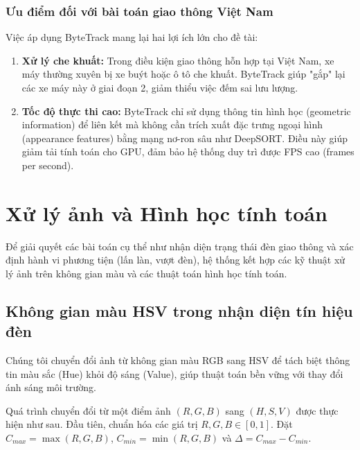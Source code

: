 \subsubsection{Ưu điểm đối với bài toán giao thông Việt Nam}
Việc áp dụng ByteTrack mang lại hai lợi ích lớn cho đề tài:
\begin{enumerate}
    \item \textbf{Xử lý che khuất:} Trong điều kiện giao thông hỗn hợp tại Việt Nam, xe máy thường xuyên bị xe buýt hoặc ô tô che khuất. ByteTrack giúp "gắp" lại các xe máy này ở giai đoạn 2, giảm thiểu việc đếm sai lưu lượng.
    \item \textbf{Tốc độ thực thi cao:} ByteTrack chỉ sử dụng thông tin hình học (geometric information) để liên kết mà không cần trích xuất đặc trưng ngoại hình (appearance features) bằng mạng nơ-ron sâu như DeepSORT. Điều này giúp giảm tải tính toán cho GPU, đảm bảo hệ thống duy trì được FPS cao (frames per second).
\end{enumerate}

\section{Xử lý ảnh và Hình học tính toán}
\label{sec:cv_geometry}

Để giải quyết các bài toán cụ thể như nhận diện trạng thái đèn giao thông và xác định hành vi phương tiện (lấn làn, vượt đèn), hệ thống kết hợp các kỹ thuật xử lý ảnh trên không gian màu và các thuật toán hình học tính toán.

\subsection{Không gian màu HSV trong nhận diện tín hiệu đèn}
Chúng tôi chuyển đổi ảnh từ không gian màu RGB sang HSV để tách biệt thông tin màu sắc (Hue) khỏi độ sáng (Value), giúp thuật toán bền vững với thay đổi ánh sáng môi trường.

Quá trình chuyển đổi từ một điểm ảnh $(R, G, B)$ sang $(H, S, V)$ được thực hiện như sau. Đầu tiên, chuẩn hóa các giá trị $R, G, B \in [0, 1]$. Đặt $C_{max} = \max(R, G, B)$, $C_{min} = \min(R, G, B)$ và $\Delta = C_{max} - C_{min}$.

